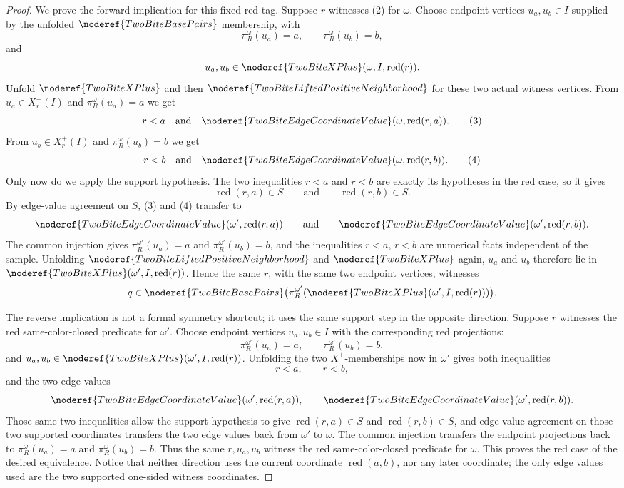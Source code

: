\begin{proof}
We prove the forward implication for this fixed red tag.  Suppose \(r\)
witnesses (2) for \(\omega\).  Choose endpoint vertices
\(u_a,u_b\in I\) supplied by the unfolded
\(\noderef{TwoBiteBasePairs}\) membership, with
\[
\pi_R^\omega(u_a)=a,\qquad \pi_R^\omega(u_b)=b,
\]
and
\[
u_a,u_b\in
\noderef{TwoBiteXPlus}(\omega,I,\operatorname{red}(r)).
\]
Unfold \(\noderef{TwoBiteXPlus}\) and then
\(\noderef{TwoBiteLiftedPositiveNeighborhood}\) for these two actual witness
vertices.  From \(u_a\in X_r^+(I)\) and \(\pi_R^\omega(u_a)=a\) we get
\[
r<a
\quad\text{and}\quad
\noderef{TwoBiteEdgeCoordinateValue}(\omega,\operatorname{red}(r,a)).
\tag{3}
\]
From \(u_b\in X_r^+(I)\) and \(\pi_R^\omega(u_b)=b\) we get
\[
r<b
\quad\text{and}\quad
\noderef{TwoBiteEdgeCoordinateValue}(\omega,\operatorname{red}(r,b)).
\tag{4}
\]
Only now do we apply the support hypothesis.  The two inequalities \(r<a\)
and \(r<b\) are exactly its hypotheses in the red case, so it gives
\[
\operatorname{red}(r,a)\in S
\qquad\text{and}\qquad
\operatorname{red}(r,b)\in S.
\tag{5}
\]
By edge-value agreement on \(S\), (3) and (4) transfer to
\[
\noderef{TwoBiteEdgeCoordinateValue}(\omega',\operatorname{red}(r,a))
\qquad\text{and}\qquad
\noderef{TwoBiteEdgeCoordinateValue}(\omega',\operatorname{red}(r,b)).
\]
The common injection gives
\(\pi_R^{\omega'}(u_a)=a\) and \(\pi_R^{\omega'}(u_b)=b\), and the
inequalities \(r<a\), \(r<b\) are numerical facts independent of the sample.
Unfolding
\(\noderef{TwoBiteLiftedPositiveNeighborhood}\) and
\(\noderef{TwoBiteXPlus}\) again, \(u_a\) and \(u_b\) therefore lie in
\(\noderef{TwoBiteXPlus}(\omega',I,\operatorname{red}(r))\).  Hence the same
\(r\), with the same two endpoint vertices, witnesses
\[
q\in
\noderef{TwoBiteBasePairs}
\bigl(\pi_R^{\omega'}(
\noderef{TwoBiteXPlus}(\omega',I,\operatorname{red}(r)))\bigr).
\]

The reverse implication is not a formal symmetry shortcut; it uses the same
support step in the opposite direction.  Suppose \(r\) witnesses the red
same-color-closed predicate for \(\omega'\).  Choose endpoint vertices
\(u_a,u_b\in I\) with the corresponding red projections:
\[
\pi_R^{\omega'}(u_a)=a,\qquad \pi_R^{\omega'}(u_b)=b,
\]
and \(u_a,u_b\in
\noderef{TwoBiteXPlus}(\omega',I,\operatorname{red}(r))\).  Unfolding the
two \(X^+\)-memberships now in \(\omega'\) gives both inequalities
\[
r<a,\qquad r<b,
\]
and the two edge values
\[
\noderef{TwoBiteEdgeCoordinateValue}(\omega',\operatorname{red}(r,a)),
\qquad
\noderef{TwoBiteEdgeCoordinateValue}(\omega',\operatorname{red}(r,b)).
\]
Those same two inequalities allow the support hypothesis to give
\(\operatorname{red}(r,a)\in S\) and
\(\operatorname{red}(r,b)\in S\), and edge-value agreement on those two
supported coordinates transfers the two edge values back from \(\omega'\) to
\(\omega\).  The common injection transfers the endpoint projections back to
\(\pi_R^\omega(u_a)=a\) and \(\pi_R^\omega(u_b)=b\).  Thus the same
\(r,u_a,u_b\) witness the red same-color-closed predicate for \(\omega\).
This proves the red case of the desired equivalence.  Notice that neither
direction uses the current coordinate \(\operatorname{red}(a,b)\), nor any
later coordinate; the only edge values used are the two supported one-sided
witness coordinates.


\end{proof}
